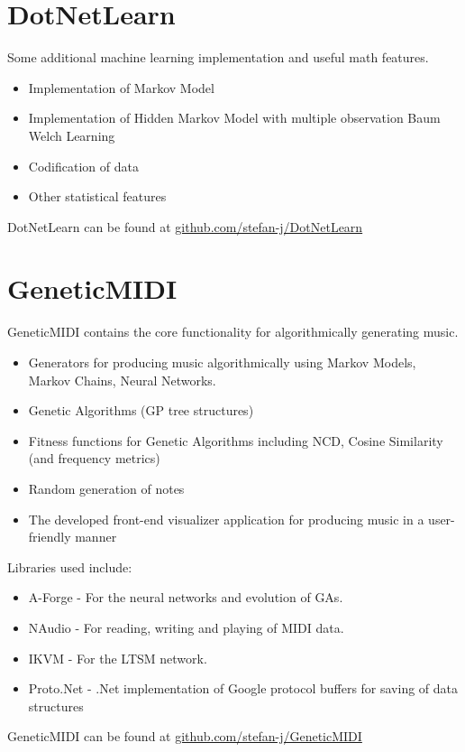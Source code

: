 \section{DotNetLearn}
Some additional machine learning implementation and useful math features.
\begin{itemize}
\item Implementation of Markov Model
\item Implementation of Hidden Markov Model with multiple observation Baum Welch Learning
\item Codification of data
\item Other statistical features
\end{itemize}
DotNetLearn can be found at \href{https://github.com/stefan-j/DotNetLearn}{github.com/stefan-j/DotNetLearn}

\section{GeneticMIDI}
GeneticMIDI contains the core functionality for algorithmically generating music.
\begin{itemize}
\item Generators for producing music algorithmically using Markov Models, Markov Chains, Neural Networks.
\item Genetic Algorithms (\ac{GP} tree structures)
\item Fitness functions for Genetic Algorithms including \ac{NCD}, Cosine Similarity (and frequency metrics)
\item Random generation of notes
\item The developed front-end visualizer application for producing music in a user-friendly manner
\end{itemize}

Libraries used include:
\begin{itemize}
\item A-Forge - For the neural networks and evolution of \acp{GA}.
\item NAudio - For reading, writing and playing of \ac{MIDI} data. 
\item IKVM - For the \ac{LTSM} network.
\item Proto.Net - .Net implementation of Google protocol buffers for saving of data structures
\end{itemize}

GeneticMIDI can be found at \href{https://github.com/stefan-j/GeneticMIDI}{github.com/stefan-j/GeneticMIDI}

